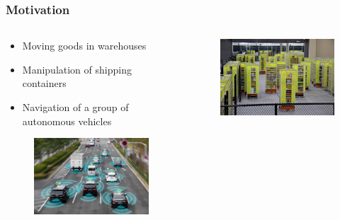 \documentclass[aspectratio=169,t,xcolor=table]{beamer}
\begin{document}
\begin{frame}
\frametitle{Motivation}
\begin{columns}
\begin{column}{.5\textwidth}
\begin{itemize}
    \item Moving goods in warehouses
    \item Manipulation of shipping containers
    \item Navigation of a group of autonomous vehicles
\end{itemize}
\begin{figure}
        \centering
        \includegraphics[width=.7\textwidth]{figs/autonomous-car.jpg}
    \end{figure}
 
\end{column}
\begin{column}{.4\textwidth}
    \begin{figure}
        \centering
        \includegraphics[width=.7\textwidth]{figs/roboti-amazon.jpg}
    \end{figure}
    

\end{column}
\end{columns}
\end{frame}
\end{document}
